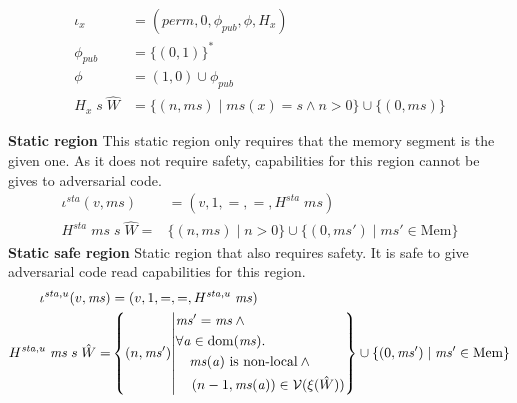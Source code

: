 \documentclass[format=acmsmall, review=true, screen=true]{acmart}
\newcommand{\union}{\mathbin{\cup}}
\DeclareMathOperator{\dom}{dom}
\newcommand{\var}[1]{\mathit{#1}}
\newcommand{\hs}{\var{ms}}
\newcommand{\ms}{\hs}
\newcommand{\addr}{\var{a}}
\newcommand{\perm}{\var{perm}}
\newcommand{\sta}{\var{sta}}
\newcommand{\pub}{\var{pub}}
\newcommand{\asmType}{\plaindom{AsmType}}
\newcommand{\plaindom}[1]{\mathrm{#1}}
\newcommand{\Heaps}{\plaindom{Mem}}
\newcommand{\Mems}{\Heaps}
\newcommand{\intr}[2]{\mathcal{#1}}
\newcommand{\valueintr}[1]{\intr{V}{#1}}
\newcommand{\stdvr}{\valueintr{\asmType}}
\newcommand{\npair}[2][n]{\left(#1,#2 \right)}
\newcommand{\nonlocal}[1]{\ensuremath{#1} \text{ is non-local}}
\begin{document}
\begin{definition}
  \label{def:iotax-region}
  \begin{align*}
    \iota_x   & = (\perm, 0, \phi_\pub, \phi, H_x) \\
    \phi_\pub & = \{(0,1)\}^* \\
    \phi      & = (1,0) \union \phi_\pub \\
    H_x \; s \; \hat{W} & = \{\npair{\ms} \mid \ms(x) = s \land n > 0 \} \union \{\npair[0]{\ms}\}
  \end{align*}
\end{definition}
\textbf{Static region} This static region only requires that the memory segment is the given one.
As it does not require safety, capabilities for this region cannot be gives to adversarial code.
\begin{align*}
  \iota^\sta (v,\ms) &= (v,1,=,=,H^\sta\;\ms)\\
  H^\sta \; \ms \; s \; \hat{W} = & \{\npair{\ms} \mid n > 0 \} \union \{\npair[0]{\ms'} \mid \ms' \in \Mems \}
\end{align*}
\textbf{Static safe region} Static region that also requires safety.
It is safe to give adversarial code read capabilities for this region.
\begin{align*}
  \iota^{\sta,u} (v,\ms) &= (v,1,=,=,H^{\sta,u}\;\ms)\\
  H^{\sta,u} \; \ms \; s \; \hat{W} = & \left\{\npair{\ms'} \middle|
    \begin{aligned}
      &\ms' = \ms \land{}\\
      &\forall \addr \in \dom(\ms) \ldotp\\
      & \quad \nonlocal{\ms(\addr)} \land{}\\
      & \quad \npair[n-1]{\ms(\addr)} \in \stdvr(\xi(\hat{W}))
    \end{aligned}
        \right\} \union \{\npair[0]{\ms'} \mid \ms' \in \Mems \}
\end{align*}
\end{document}

